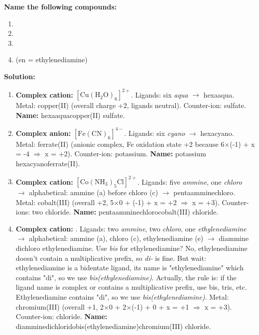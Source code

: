 \documentclass[11pt]{article}
\newcommand{\cle}[1]{{\popxbold\color{popdark}#1}}
\begin{document}
\begin{exoresolu}
\textbf{Name the following compounds:}
\begin{enumerate}
\item {}
\item {}
\item {}
\item {}  (en = ethylenediamine)
\end{enumerate}

\tcblower
\textbf{Solution:}
\begin{enumerate}
\item \textbf{Complex cation:} \ensuremath{\mathrm{[Cu(H_{2}O)_{6}]^{2+}}}. Ligands: six \textit{aqua} $\rightarrow$ hexaaqua. Metal: copper(II) (overall charge +2, ligands neutral). Counter-ion: sulfate. \textbf{Name:} \cle{hexaaquacopper(II) sulfate}.
\item \textbf{Complex anion:} \ensuremath{\mathrm{[Fe(CN)_{6}]^{4-}}}. Ligands: six \textit{cyano} $\rightarrow$ hexacyano. Metal: ferrate(II) (anionic complex, Fe oxidation state +2 because 6$\times$(-1) + x = -4 $\Rightarrow$ x = +2). Counter-ion: potassium. \textbf{Name:} \cle{potassium hexacyanoferrate(II)}.
\item \textbf{Complex cation:} \ensuremath{\mathrm{[Co(NH_{3})_{5}Cl]^{2+}}}. Ligands: five \textit{ammine}, one \textit{chloro} $\rightarrow$ alphabetical: ammine (a) before chloro (c) $\rightarrow$ pentaamminechloro. Metal: cobalt(III) (overall +2, 5$\times$0 + (-1) + x = +2 $\Rightarrow$ x = +3). Counter-ions: two chloride. \textbf{Name:} \cle{pentaamminechlorocobalt(III) chloride}.
\item \textbf{Complex cation:} \ce{[Cr(NH3)2Cl2(en)]^+}. Ligands: two \textit{ammine}, two \textit{chloro}, one \textit{ethylenediamine} $\rightarrow$ alphabetical: ammine (a), chloro (c), ethylenediamine (e) $\rightarrow$ diammine dichloro ethylenediamine. Use \textit{bis} for ethylenediamine? No, ethylenediamine doesn't contain a multiplicative prefix, so \textit{di-} is fine. But wait: ethylenediamine is a bidentate ligand, its name is "ethylenediamine" which contains "di", so we use \textit{bis(ethylenediamine)}. Actually, the rule is: if the ligand name is complex or contains a multiplicative prefix, use bis, tris, etc. Ethylenediamine contains "di", so we use \textit{bis(ethylenediamine)}. Metal: chromium(III) (overall +1, 2$\times$0 + 2$\times$(-1) + 0 + x = +1 $\Rightarrow$ x = +3). Counter-ion: chloride. \textbf{Name:} \cle{diamminedichloridobis(ethylenediamine)chromium(III) chloride}.
\end{enumerate}
\end{exoresolu}
\end{document}
